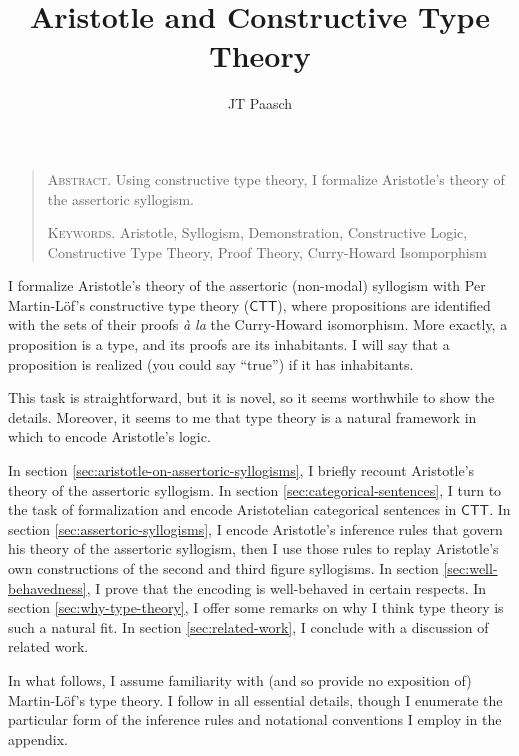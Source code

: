\documentclass{article}
\newcommand\e{\mathsf}
\def\CTT/{$\e{CTT}$}
\begin{document}
\title{Aristotle and Constructive Type Theory}
\author{JT Paasch}
\date{}

\maketitle


\begin{quote}
    \textsc{Abstract}.
    Using constructive type theory, I formalize Aristotle's theory of the assertoric syllogism.

  \textsc{Keywords}. Aristotle, Syllogism, Demonstration, Constructive Logic, Constructive Type Theory, Proof Theory, Curry-Howard Isomporphism
\end{quote}

\noindent
I formalize Aristotle's theory of the assertoric (non-modal) syllogism with Per Martin-L\"of's constructive type theory (\CTT/), where propositions are identified with the sets of their proofs \emph{\`a la} the Curry-Howard isomorphism. More exactly, a proposition is a type, and its proofs are its inhabitants. I will say that a proposition is realized (you could say ``true'') if it has inhabitants.

This task is straightforward, but it is novel, so it seems worthwhile to show the details. Moreover, it seems to me that type theory is a natural framework in which to encode Aristotle's logic.

In section \ref{sec:aristotle-on-assertoric-syllogisms}, I briefly recount Aristotle's theory of the assertoric syllogism. In section \ref{sec:categorical-sentences}, I turn to the task of formalization and encode Aristotelian categorical sentences in \CTT/. In section \ref{sec:assertoric-syllogisms}, I encode Aristotle's inference rules that govern his theory of the assertoric syllogism, then I use those rules to replay Aristotle's own constructions of the second and third figure syllogisms. In section \ref{sec:well-behavedness}, I prove that the encoding is well-behaved in certain respects. In section \ref{sec:why-type-theory}, I offer some remarks on why I think type theory is such a natural fit. In section \ref{sec:related-work}, I conclude with a discussion of related work. 

In what follows, I assume familiarity with (and so provide no exposition of) Martin-L\"of's type theory. I follow \citet{MartinLof1984} in all essential details, though I enumerate the particular form of the inference rules and notational conventions I employ in the appendix.
\end{document}
